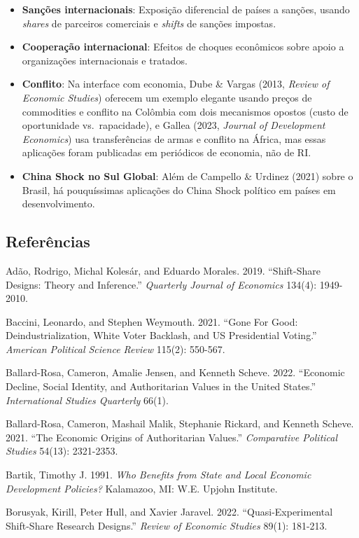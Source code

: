 \documentclass[
]{article}
\providecommand{\tightlist}{%
  \setlength{\itemsep}{0pt}\setlength{\parskip}{0pt}}
\begin{document}
\begin{itemize}
\tightlist
\item
  \textbf{Sanções internacionais}: Exposição diferencial de países a sanções, usando \emph{shares} de parceiros comerciais e \emph{shifts} de sanções impostas.
\item
  \textbf{Cooperação internacional}: Efeitos de choques econômicos sobre apoio a organizações internacionais e tratados.
\item
  \textbf{Conflito}: Na interface com economia, Dube \& Vargas (2013, \emph{Review of Economic Studies}) oferecem um exemplo elegante usando preços de commodities e conflito na Colômbia com dois mecanismos opostos (custo de oportunidade vs.~rapacidade), e Gallea (2023, \emph{Journal of Development Economics}) usa transferências de armas e conflito na África, mas essas aplicações foram publicadas em periódicos de economia, não de RI.
\item
  \textbf{China Shock no Sul Global}: Além de Campello \& Urdinez (2021) sobre o Brasil, há pouquíssimas aplicações do China Shock político em países em desenvolvimento.
\end{itemize}

\subsection{Referências}\label{referuxeancias-5}

Adão, Rodrigo, Michal Kolesár, and Eduardo Morales. 2019. ``Shift-Share Designs: Theory and Inference.'' \emph{Quarterly Journal of Economics} 134(4): 1949-2010.

Baccini, Leonardo, and Stephen Weymouth. 2021. ``Gone For Good: Deindustrialization, White Voter Backlash, and US Presidential Voting.'' \emph{American Political Science Review} 115(2): 550-567.

Ballard-Rosa, Cameron, Amalie Jensen, and Kenneth Scheve. 2022. ``Economic Decline, Social Identity, and Authoritarian Values in the United States.'' \emph{International Studies Quarterly} 66(1).

Ballard-Rosa, Cameron, Mashail Malik, Stephanie Rickard, and Kenneth Scheve. 2021. ``The Economic Origins of Authoritarian Values.'' \emph{Comparative Political Studies} 54(13): 2321-2353.

Bartik, Timothy J. 1991. \emph{Who Benefits from State and Local Economic Development Policies?} Kalamazoo, MI: W.E. Upjohn Institute.

Borusyak, Kirill, Peter Hull, and Xavier Jaravel. 2022. ``Quasi-Experimental Shift-Share Research Designs.'' \emph{Review of Economic Studies} 89(1): 181-213.
\end{document}
